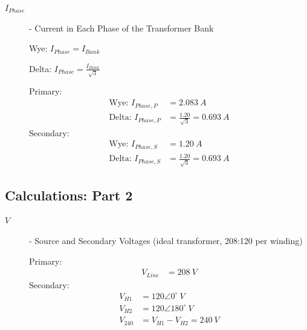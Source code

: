 \begin{description}
\begin{description}
	\item[$I_{Phase}$] - Current in Each Phase of the Transformer Bank
	      \begin{center}
		      Wye: $I_{Phase} = I_{Bank}$
	      \end{center}
	      \begin{center}
		      Delta: $I_{Phase} = \frac{I_{Bank}}{\sqrt{3}}$
	      \end{center}
	      \begin{center}
		      Primary:
		      \begin{align*}
			      \text{Wye: } I_{Phase,P}   & = 2.083 \ A                         \\
			      \text{Delta: } I_{Phase,P} & = \frac{1.20}{\sqrt{3}} = 0.693 \ A
		      \end{align*}
		      Secondary:
		      \begin{align*}
			      \text{Wye: } I_{Phase,S}   & = 1.20 \ A                          \\
			      \text{Delta: } I_{Phase,S} & = \frac{1.20}{\sqrt{3}} = 0.693 \ A
		      \end{align*}
	      \end{center}

\end{description}

\subsection{Calculations: Part 2}
\begin{description}

	\item[$V$] - Source and Secondary Voltages (ideal transformer, 208:120 per winding)
	      \begin{center}
		      Primary:
		      \begin{align*}
			      V_{Line} & = 208 \ V
		      \end{align*}
		      Secondary:
		      \begin{align*}
			      V_{H1}  & = 120\angle 0^\circ \ V     \\
			      V_{H2}  & = 120\angle 180^\circ \ V   \\
			      V_{240} & = V_{H1} - V_{H2} = 240 \ V
		      \end{align*}
	      \end{center}


\end{description}
\end{description}
